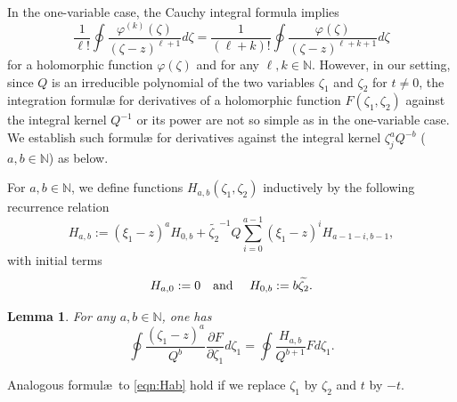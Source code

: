 \documentclass[12pt,leqno]{amsart}
\theoremstyle{plain}
\newtheorem{lemma}[thm]{Lemma}
\theoremstyle{definition}
\begin{document}
In the one-variable case, 
 the Cauchy integral formula implies
\[
   \frac{1}{\ell !}
   \oint \frac{\varphi^{(k)}(\zeta)}{(\zeta-z)^{\ell+1}} d \zeta
   =
   \frac{1}{(\ell+k) !}
   \oint \frac{\varphi(\zeta)}{(\zeta-z)^{\ell+k+1}} d \zeta
\]
for a holomorphic function $\varphi(\zeta)$
 and for any $\ell, k \in {\mathbb{N}}$.  
However, 
 in our setting,
 since $Q$ is an irreducible polynomial
 of the two variables $\zeta_1$ and $\zeta_2$ for $t \ne 0$, 
 the integration formul{\ae} for derivatives
 of a holomorphic function $F(\zeta_1,\zeta_2)$
 against the integral kernel $Q^{-1}$ 
 or its power 
 are not so simple
 as in the one-variable case.  
We establish such formul{\ae} for derivatives 
 against the integral kernel $\zeta_j^a Q^{-b}$
 ($a,b \in {\mathbb{N}}$) as below.   



For $a, b \in {\mathbb{N}}$, 
 we define functions 
 $H_{a,b}(\zeta_1, \zeta_2)$
 inductively by the following recurrence relation
\begin{equation}
\label{eqn:Habdef}
   H_{a,b}:=(\xi_1-z)^a H_{0,b} + \widetilde{\zeta_2}^{-1} Q
   \sum_{i=0}^{a-1} (\xi_1-z)^iH_{a-1-i,b-1}, 
\end{equation}
with initial terms
\begin{equation}
\label{eqn:23031774}
\text{$H_{a,0}:=0$\quad and \quad$H_{0,b}:=b \widetilde{\zeta_2}$}.  
\end{equation}

\begin{lemma}
\label{lem:230326}
For any $a, b \in {\mathbb{N}}$, 
 one has
\begin{equation}
\label{eqn:Hab}
  \oint\frac{(\zeta_1-z)^a}{Q^b}\frac{\partial F}{\partial \zeta_1}d \zeta_1
=
  \oint \frac{H_{a,b}}{Q^{b+1}}F d \zeta_1.  
\end{equation}
\end{lemma}

Analogous formul\ae\ to \eqref{eqn:Hab} hold
 if we replace $\zeta_1$ by $\zeta_2$ and $t$ by $-t$.  
\end{document}
